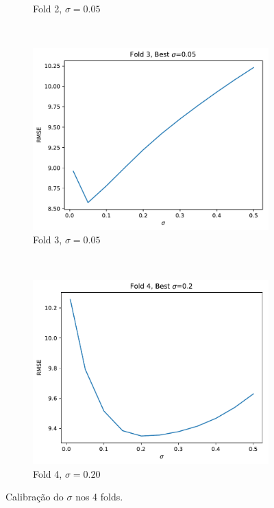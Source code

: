 \documentclass{article}
\begin{document}
\begin{figure}[h!]
\begin{subfigure}[t]{0.24\textwidth}
		\caption{Fold 2, $\sigma=0.05$}
		\label{fig:exercicio2-fold2}
	\end{subfigure}%
	~
	\begin{subfigure}[t]{0.24\textwidth}
		\centering
		\includegraphics[width=\linewidth]{exercicio2-fold-3.pdf}
		\caption{Fold 3, $\sigma=0.05$}
		\label{fig:exercicio2-fold3}
	\end{subfigure}%
	~
	\begin{subfigure}[t]{0.24\textwidth}
		\centering
		\includegraphics[width=\linewidth]{exercicio2-fold-4.pdf}
		\caption{Fold 4, $\sigma=0.20$}
		\label{fig:exercicio2-fold4}
	\end{subfigure}
	\caption{Calibração do $\sigma$ nos 4 folds.}
	\label{fig:exercicio2}
\end{figure}
\end{document}
